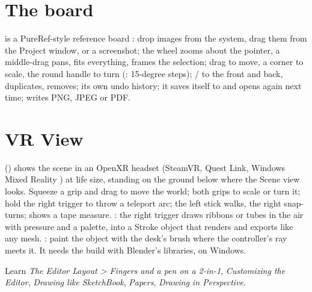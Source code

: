 \section{The board}
 is a PureRef-style reference board \cite{PureRef2026}: drop images from the system, drag them from
the Project window,  or  a screenshot; the wheel zooms about the pointer, a middle-drag
pans,  fits everything,  frames the selection; drag to move, a corner to scale, the round handle to turn
(: 15-degree steps); \key{Ctrl+]} / \key{Ctrl+[} to the front and back,  duplicates, 
removes; its own undo history; it saves itself to  and opens again next time;  writes PNG, JPEG or PDF.

\section{VR View}
 () shows the scene in an OpenXR headset (SteamVR, Quest Link, Windows Mixed
Reality \cite{OpenXR2026}) at life size, standing on the ground below where the Scene view looks. Squeeze a grip and
drag to move the world; both grips to scale or turn it; hold the right trigger to throw a teleport arc; the left stick
walks, the right snap-turns;  shows a tape measure. : the right trigger draws ribbons or tubes
in the air with pressure and a palette, into a Stroke object that renders and exports like any mesh. : paint the object with the desk's brush where the controller's ray meets it. It needs the build with Blender's
libraries, on Windows.

\begin{fromnote}{Learn}
\emph{The Editor Layout > Fingers and a pen on a 2-in-1}, \emph{Customizing the Editor}, \emph{Drawing like SketchBook},
\emph{Papers}, \emph{Drawing in Perspective}.
\end{fromnote}
